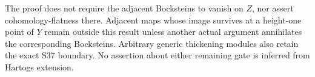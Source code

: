 The proof does not require the adjacent
Bocksteins to vanish on $Z$, nor assert
cohomology-flatness there. Adjacent maps
whose image survives at a height-one point
of $Y$ remain outside this result unless
another actual argument annihilates the
corresponding Bocksteins. Arbitrary generic
thickening modules also retain the exact
S37 boundary. No assertion about either
remaining gate is inferred from Hartogs
extension.
